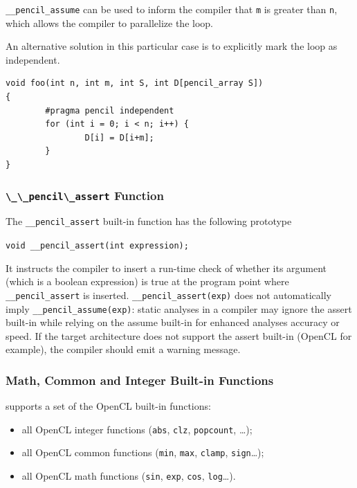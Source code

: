 \lstinline!__pencil_assume! can be used to inform the compiler that
\lstinline!m! is greater than \lstinline!n!, which allows the compiler
to parallelize the loop.

An alternative solution in this particular case is to explicitly
mark the loop as independent.

  \begin{lstlisting}[language=pencil]
void foo(int n, int m, int S, int D[pencil_array S])
{
        #pragma pencil independent
        for (int i = 0; i < n; i++) {
                D[i] = D[i+m];
        }
}
  \end{lstlisting}


\subsubsection{\lstinline!\_\_pencil\_assert! Function}

The \lstinline!__pencil_assert! built-in function has the following prototype

\lstinline!void __pencil_assert(int expression);!

  It instructs the compiler to insert a run-time check of whether its argument
  (which is a boolean expression) is true at the program point where
  \lstinline!__pencil_assert! is inserted.
  \lstinline!__pencil_assert(exp)! does not automatically imply
  \lstinline!__pencil_assume(exp)!: static analyses in a \pencil compiler may
  ignore the assert built-in while relying on
  the assume built-in for enhanced analyses accuracy or speed.  If the
  target architecture does not support the assert built-in (OpenCL for
  example), the \pencil compiler should emit a warning message.

\subsubsection{\pencil Math, Common and Integer Built-in Functions}

\pencil supports a set of the OpenCL built-in functions:
\begin{itemize}
  \item all OpenCL integer functions (\lstinline!abs!, \lstinline!clz!,
        \lstinline!popcount!,  \dots);
  \item all OpenCL common functions (\lstinline!min!, \lstinline!max!,
        \lstinline!clamp!, \lstinline!sign!\dots);
  \item all OpenCL math functions (\lstinline!sin!, \lstinline!exp!,
        \lstinline!cos!, \lstinline!log!\dots).
\end{itemize}

